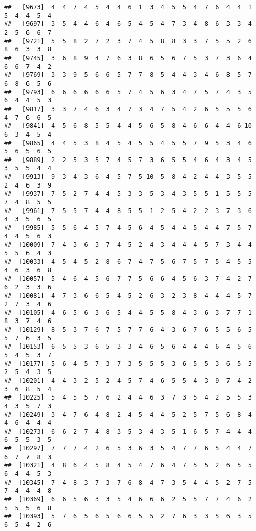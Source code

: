 \documentclass[
]{book}
\begin{document}
\begin{verbatim}
##   [9673]  4  4  7  4  5  4  4  6  1  3  4  5  5  4  7  6  4  4  1  5  4  4  5  4
##   [9697]  3  5  4  4  6  4  6  5  4  5  4  7  3  4  8  6  3  3  4  2  5  6  6  7
##   [9721]  5  5  8  2  7  2  3  7  4  5  8  8  3  3  7  5  5  2  6  8  6  3  3  8
##   [9745]  3  6  8  9  4  7  6  3  8  6  5  6  7  5  3  7  3  6  4  6  6  7  4  2
##   [9769]  3  3  9  5  6  6  5  7  7  8  5  4  4  3  4  6  8  5  7  6  8  6  5  6
##   [9793]  6  6  6  6  6  6  5  7  4  5  6  3  4  7  5  7  4  3  5  6  4  4  5  3
##   [9817]  3  3  7  4  6  3  4  7  3  4  7  5  4  2  6  5  5  5  6  4  7  6  6  5
##   [9841]  4  5  6  8  5  5  4  4  5  6  5  8  4  6  6  4  4  6 10  6  3  4  5  4
##   [9865]  4  4  5  3  8  4  5  4  5  5  4  5  5  7  9  5  3  4  6  5  6  5  6  5
##   [9889]  2  2  5  3  5  7  4  5  7  3  6  5  5  4  6  4  3  4  5  3  5  5  4  4
##   [9913]  9  3  4  3  6  4  5  7  5 10  5  8  4  2  4  4  3  5  5  2  4  6  3  9
##   [9937]  7  5  2  7  4  4  5  3  3  5  3  4  3  5  5  1  5  5  5  7  4  8  5  5
##   [9961]  7  5  5  7  4  4  8  5  5  1  2  5  4  2  2  3  7  3  6  4  3  5  6  5
##   [9985]  5  5  6  4  5  7  4  5  6  4  5  4  4  5  4  4  7  5  7  4  4  5  6  3
##  [10009]  7  4  3  6  3  7  4  5  2  4  3  4  4  4  5  7  3  4  4  5  5  6  4  3
##  [10033]  4  5  4  5  2  8  6  7  4  7  5  6  7  5  7  5  4  5  5  4  6  3  6  8
##  [10057]  5  4  6  4  5  6  7  7  5  6  6  4  5  6  3  7  4  2  7  6  2  3  3  6
##  [10081]  4  7  3  6  6  5  4  5  2  6  3  2  3  8  4  4  4  5  7  2  7  3  4  6
##  [10105]  4  6  5  6  3  6  5  4  4  5  5  8  4  3  6  3  7  7  1  8  3  7  4  6
##  [10129]  8  5  3  7  6  7  5  7  7  6  4  3  6  7  6  5  5  6  5  5  7  6  3  5
##  [10153]  6  5  5  3  6  5  3  3  4  6  5  6  4  4  4  6  4  5  6  5  4  5  3  7
##  [10177]  5  6  4  5  7  3  7  3  5  5  5  3  6  5  5  3  6  5  5  2  5  4  3  5
##  [10201]  4  4  3  2  5  2  4  5  7  4  6  5  5  4  3  9  7  4  2  3  6  8  5  4
##  [10225]  5  4  5  5  7  6  2  4  4  6  3  7  3  5  4  2  5  5  3  4  3  5  7  3
##  [10249]  3  4  7  6  4  8  2  4  5  4  4  5  2  5  7  5  6  8  4  4  6  4  4  4
##  [10273]  6  6  2  7  4  8  3  5  3  4  3  5  1  6  5  7  4  4  4  6  5  5  3  5
##  [10297]  7  7  7  4  2  6  5  3  6  3  5  4  7  7  6  5  4  4  7  6  7  7  8  3
##  [10321]  4  8  6  4  5  8  4  5  4  7  6  4  7  5  5  2  6  5  5  6  4  4  5  3
##  [10345]  7  4  8  3  7  3  7  6  8  4  7  3  5  4  4  5  2  7  5  7  4  4  4  8
##  [10369]  6  6  5  6  3  3  5  4  6  6  6  2  5  5  7  7  4  6  2  5  5  5  6  8
##  [10393]  5  7  6  5  6  5  6  6  5  5  2  7  6  3  3  5  6  3  5  6  5  4  2  6

\end{verbatim}
\end{document}
